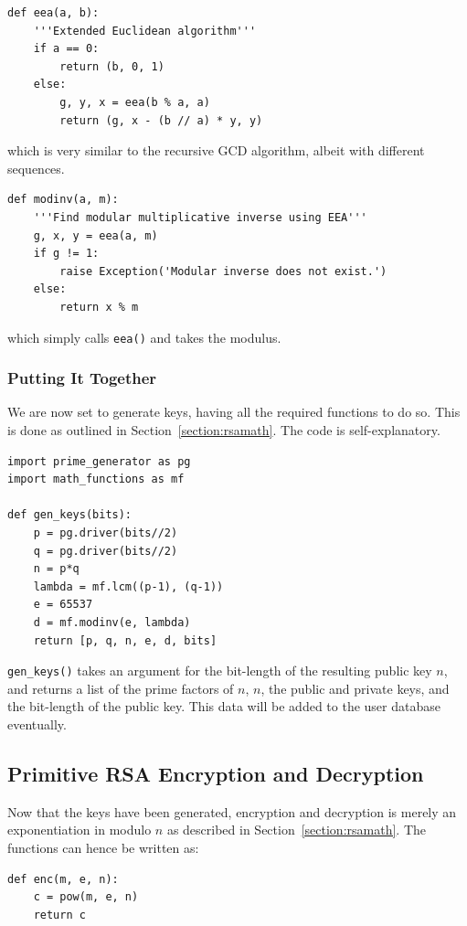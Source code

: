 \documentclass{article}
\begin{document}
\begin{verbatim}
def eea(a, b):
    '''Extended Euclidean algorithm'''
    if a == 0:
        return (b, 0, 1)
    else:
        g, y, x = eea(b % a, a)
        return (g, x - (b // a) * y, y)
\end{verbatim}

which is very similar to the recursive GCD algorithm, albeit with different sequences.

\begin{verbatim}
def modinv(a, m):
    '''Find modular multiplicative inverse using EEA'''
    g, x, y = eea(a, m)
    if g != 1:
        raise Exception('Modular inverse does not exist.')
    else:
        return x % m
\end{verbatim}

which simply calls \texttt{eea()} and takes the modulus.

\subsubsection{Putting It Together}
We are now set to generate keys, having all the required functions to do so. This is done as
outlined in Section~\ref{section:rsamath}. The code is self-explanatory.

\begin{verbatim}
import prime_generator as pg
import math_functions as mf

def gen_keys(bits):
    p = pg.driver(bits//2)
    q = pg.driver(bits//2)
    n = p*q
    lambda = mf.lcm((p-1), (q-1))
    e = 65537
    d = mf.modinv(e, lambda)
    return [p, q, n, e, d, bits]
\end{verbatim}

\texttt{gen\_keys()} takes an argument for the bit-length of the resulting public key $n$, and
returns a list of the prime factors of $n$, $n$, the public and private keys, and the bit-length of
the public key. This data will be added to the user database eventually.

\subsection{Primitive RSA Encryption and Decryption}

Now that the keys have been generated, encryption and decryption is merely an exponentiation in
modulo $n$ as described in Section~\ref{section:rsamath}. The functions can hence be written as:
\begin{verbatim}
def enc(m, e, n):
    c = pow(m, e, n)
    return c
\end{verbatim}
\end{document}
